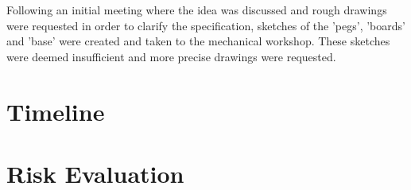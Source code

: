 Following an initial meeting where the idea was discussed and rough drawings were requested in order to clarify the specification, sketches of the 'pegs', 'boards' and 'base' were created and taken to the mechanical workshop. These sketches were deemed insufficient and more precise drawings were requested. 



\section{Timeline}\label{pm/timeline}



\section{Risk Evaluation}\label{pm/riskeval}